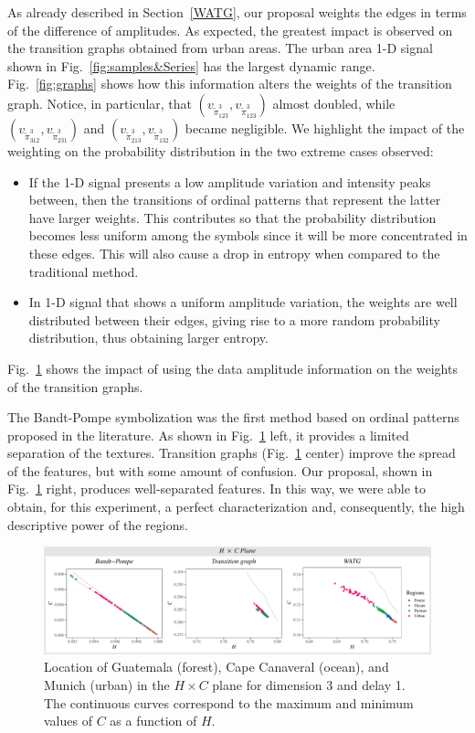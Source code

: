 \documentclass[journal]{IEEEtran}
\begin{document}
As already described in Section~\ref{WATG}, our proposal weights the edges in terms of the difference of amplitudes.
As expected, the greatest impact is observed on the transition graphs obtained from urban areas.
The urban area \mbox{1-D} signal shown in Fig.~\ref{fig:samples&Series} has the largest dynamic range.
Fig.~\ref{fig:graphs} shows how this information alters the weights of the transition graph.
Notice, in particular, that 
$(v_{\widetilde \pi^3_{123}}, v_{\widetilde \pi^3_{123}})$ almost doubled, while 
$(v_{\widetilde \pi^3_{312}}, v_{\widetilde \pi^3_{231}})$ and $(v_{\widetilde \pi^3_{213}}, v_{\widetilde \pi^3_{132}})$ became negligible.
We highlight the impact of the weighting on the probability distribution in the two extreme cases observed:
\begin{itemize}
	\item If the \mbox{1-D} signal presents a low amplitude variation and intensity peaks between, then the transitions of ordinal patterns that represent the latter have larger weights.
	This contributes so that the probability distribution becomes less uniform among the symbols since it will be more concentrated in these edges.
	This will also cause a drop in entropy when compared to the traditional method.
	\item In \mbox{1-D} signal that shows a uniform amplitude variation, the weights are well distributed between their edges, giving rise to a more random probability distribution, thus obtaining larger entropy.
\end{itemize}

Fig.~\ref{fig:plotsHC} shows the impact of using the data amplitude information on the weights of the transition graphs.

The Bandt-Pompe symbolization was the first method based on ordinal patterns proposed in the literature.
As shown in Fig.~\ref{fig:plotsHC} left, it provides a limited separation of the textures.
Transition graphs (Fig.~\ref{fig:plotsHC} center) improve the spread of the features, but with some amount of confusion.
Our proposal, shown in Fig.~\ref{fig:plotsHC} right, produces well-separated features.
In this way, we were able to obtain, for this experiment, a perfect characterization and, consequently, the high descriptive power of the regions.

\begin{figure}%
	\includegraphics[width=2\columnwidth]{Figures/HCAnalysis.pdf}
	\caption{Location of Guatemala (forest), Cape Canaveral (ocean), and Munich (urban) in the $H \times C$ plane for dimension 3 and delay 1. 
	The continuous curves correspond to the maximum and minimum values of $C$ as a function of $H$.}
	\label{fig:plotsHC}
\end{figure}
\end{document}
